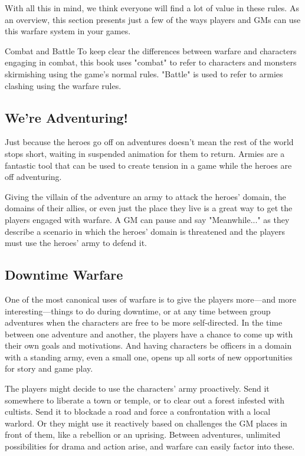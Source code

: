 \documentclass[10pt,a4paper,twoside,bg=print,twocolumn,openany,nodeprecatedcode]{dndbook}
\begin{document}
With all this in mind, we think everyone will find a lot of value in these rules. As an overview, this section presents just a few of the ways players and GMs can use this warfare system in your games.

\begin{DndSidebar}[float=!b]{Combat and Battle}
To keep clear the differences between warfare and characters engaging in combat, this book uses "combat" to refer to characters and monsters skirmishing using the game's normal rules. "Battle" is used to refer to armies clashing using the warfare rules.



\end{DndSidebar}

\subsection{We're Adventuring!}
Just because the heroes go off on adventures doesn't mean the rest of the world stops short, waiting in suspended animation for them to return. Armies are a fantastic tool that can be used to create tension in a game while the heroes are off adventuring.

Giving the villain of the adventure an army to attack the heroes' domain, the domains of their allies, or even just the place they live is a great way to get the players engaged with warfare. A GM can pause and say "Meanwhile..." as they describe a scenario in which the heroes' domain is threatened and the players must use the heroes' army to defend it.

\subsection{Downtime Warfare}
One of the most canonical uses of warfare is to give the players more—and more interesting—things to do during downtime, or at any time between group adventures when the characters are free to be more self-directed. In the time between one adventure and another, the players have a chance to come up with their own goals and motivations. And having characters be officers in a domain with a standing army, even a small one, opens up all sorts of new opportunities for story and game play.

The players might decide to use the characters' army proactively. Send it somewhere to liberate a town or temple, or to clear out a forest infested with cultists. Send it to blockade a road and force a confrontation with a local warlord. Or they might use it reactively based on challenges the GM places in front of them, like a rebellion or an uprising. Between adventures, unlimited possibilities for drama and action arise, and warfare can easily factor into these.
\end{document}
